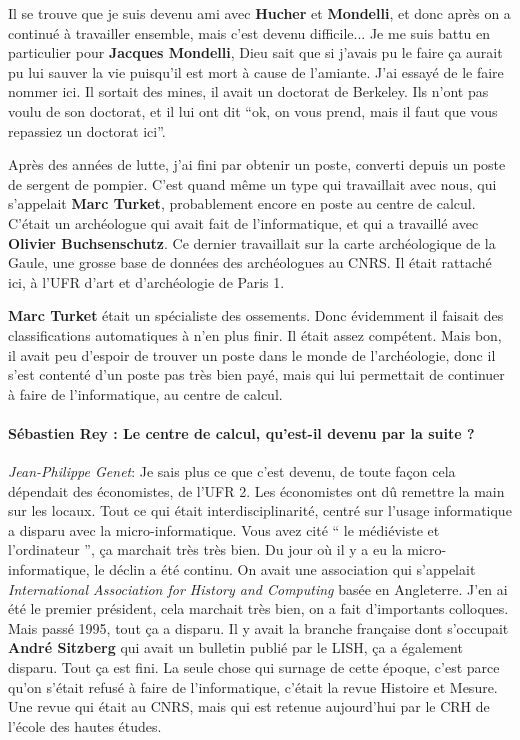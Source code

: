 Il se trouve que je suis devenu ami avec \textbf{Hucher} et \textbf{Mondelli}, et donc après on a continué à travailler ensemble, mais c'est devenu difficile... Je me suis battu en particulier pour \textbf{Jacques Mondelli}, Dieu sait que si j'avais pu le faire ça aurait pu lui sauver la vie puisqu'il est mort à cause de l'amiante. J'ai essayé de le faire nommer ici. Il sortait des mines, il avait un doctorat de Berkeley. Ils n'ont pas voulu de son doctorat, et il lui ont dit \enquote{ok, on vous prend, mais il faut que vous repassiez un doctorat ici}.

Après des années de lutte, j'ai fini par obtenir un poste, converti depuis un poste de sergent de pompier. C'est quand même un type qui travaillait avec nous, qui s'appelait \textbf{Marc Turket}, probablement encore en poste au centre de calcul. C'était un archéologue qui avait fait de l'informatique, et qui a travaillé avec \textbf{Olivier Buchsenschutz}. Ce dernier travaillait sur la carte archéologique de la Gaule, une grosse base de données des archéologues au CNRS. Il était rattaché ici, à l'UFR d'art et d'archéologie de Paris 1.

\textbf{Marc Turket} était un spécialiste des ossements. Donc évidemment il faisait des classifications automatiques à n'en plus finir. Il était assez compétent. Mais bon, il avait peu d'espoir de trouver un poste dans le monde de l'archéologie, donc il s'est contenté d'un poste pas très bien payé, mais qui lui permettait de continuer à faire de l'informatique, au centre de calcul.

\paragraph*{Sébastien Rey : Le centre de calcul, qu'est-il devenu par la suite ? }

\noindent\emph{Jean-Philippe Genet}: Je sais plus ce que c'est devenu, de toute façon cela dépendait des économistes, de l'UFR 2. Les économistes ont dû remettre la main sur les locaux. Tout ce qui était interdisciplinarité, centré sur l'usage informatique a disparu avec la micro-informatique. Vous avez cité \enquote{ le médiéviste et l'ordinateur }, ça marchait très très bien. Du jour où il y a eu la micro-informatique, le déclin a été continu. On avait une association qui s'appelait \textit{International Association for History and Computing}  basée en Angleterre. J'en ai été le premier président, cela marchait très bien, on a fait d'importants colloques. Mais passé 1995, tout ça a disparu. Il y avait la branche française dont s'occupait \textbf{André Sitzberg} qui avait un bulletin publié par le LISH, ça a également disparu. Tout ça est fini. La seule chose qui surnage de cette époque, c'est parce qu'on s'était refusé à faire de l'informatique, c'était la revue Histoire et Mesure. Une revue qui était au CNRS, mais qui est retenue aujourd'hui par le CRH de l'école des hautes études.


